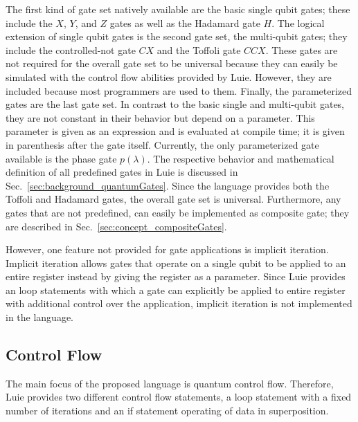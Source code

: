 The first kind of gate set natively available are the basic single qubit gates; these include the $X$, $Y$, and $Z$ gates as well as the Hadamard gate $H$. The logical extension of single qubit gates is the second gate set, the multi-qubit gates; they include the controlled-not gate $CX$ and the Toffoli gate $CCX$. These gates are not required for the overall gate set to be universal because they can easily be simulated with the control flow abilities provided by Luie. However, they are included because most programmers are used to them.
Finally, the parameterized gates are the last gate set. In contrast to the basic single and multi-qubit gates, they are not constant in their behavior but depend on a parameter. This parameter is given as an expression and is evaluated at compile time; it is given in parenthesis after the gate itself. Currently, the only parameterized gate available is the phase gate $p(\lambda)$.
The respective behavior and mathematical definition of all predefined gates in Luie is discussed in Sec.~\ref{sec:background_quantumGates}. Since the language provides both the Toffoli and Hadamard gates, the overall gate set is universal. Furthermore, any gates that are not predefined, can easily be implemented as composite gate; they are described in Sec.~\ref{sec:concept_compositeGates}.

However, one feature not provided for gate applications is implicit iteration. Implicit iteration allows gates that operate on a single qubit to be applied to an entire register instead by giving the register as a parameter. Since Luie provides an loop statements with which a gate can explicitly be applied to entire register with additional control over the application, implicit iteration is not implemented in the language.  

\subsection{Control Flow}
\label{sec:concept_controlFlow}
The main focus of the proposed language is quantum control flow. Therefore, Luie provides two different control flow statements, a loop statement with a fixed number of iterations and an if statement operating of data in superposition. 

